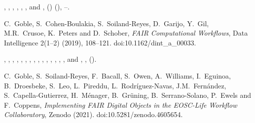 \documentclass[ds,v1.1.2,openaccess]{iosart2x}%
\begin{document}
\begin{thebibliography}{}
%
\begin{barticle}
,
,
,
,
,
,
 and
,
()
(),
--.
\end{barticle}
%
\OrigBibText
C.~Goble,
S.~Cohen-Boulakia,
S.~Soiland-Reyes,
D.~Garijo,
Y.~Gil,
M.R.~Crusoe,
K.~Peters and
D.~Schober,
\textit{{FAIR} Computational Workflows},
Data Intelligence
2(1--2)
(2019),
108--121.
doi:10.1162/dint\_a\_00033.
\endOrigBibText
{}
\endbibitem

%
\begin{barticle}
,
,
,
,
,
,
,
,
,
,
,
,
,
,
,
 and
,
,
().
\end{barticle}
%
\OrigBibText
C.~Goble,
S.~Soiland-Reyes,
F.~Bacall,
S.~Owen,
A.~Williams,
I.~Eguinoa,
B.~Droesbeke,
S.~Leo,
L.~Pireddu,
L.~Rodr\'iguez-Navas,
J.M.~Fern\'{a}ndez,
S.~Capella-Gutierrez,
H.~M\'{e}nager,
B.~Gr\"{u}ning,
B.~Serrano-Solano,
P.~Ewels and
F.~Coppens,
\textit{Implementing {FAIR} Digital Objects in the {EOSC}-Life Workflow
Collaboratory},
Zenodo
(2021).
doi:10.5281/zenodo.4605654.
\endOrigBibText
{}
\endbibitem


\end{thebibliography}
\end{document}
